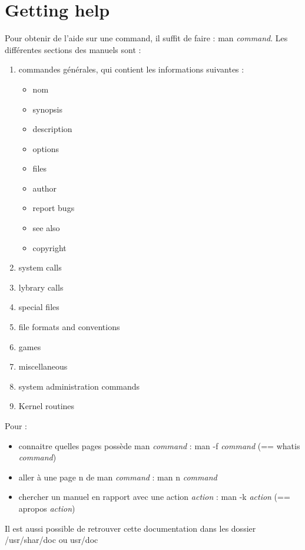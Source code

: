 \documentclass{article}
\begin{document}
\section{Getting help}
Pour obtenir de l'aide sur une command, il suffit de faire : man \textit{command}. Les différentes sections des manuels sont :
\begin{enumerate}
    \item commandes générales, qui contient les informations suivantes :
        \begin{itemize}
            \item nom
            \item synopsis
            \item description
            \item options
            \item files
            \item author
            \item report bugs
            \item see also
            \item copyright
        \end{itemize}
    \item system calls
    \item lybrary calls
    \item special files
    \item file formats and conventions
    \item games
    \item miscellaneous
    \item system administration commands
    \item Kernel routines
\end{enumerate}

Pour :
\begin{itemize}
    \item connaitre quelles pages possède man \textit{command} : man -f \textit{command} (== whatis \textit{command})
    \item aller à une page n de man \textit{command} : man n \textit{command}
    \item chercher un manuel en rapport avec une action \textit{action} : man -k \textit{action} (== apropos \textit{action})
\end{itemize}

Il est aussi possible de retrouver cette documentation dans les dossier /usr/shar/doc ou usr/doc

\newpage
\end{document}
